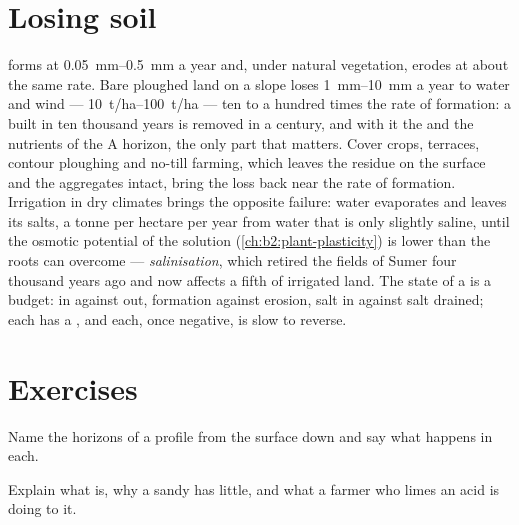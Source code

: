 \section{Losing soil}

\begin{proposition}\label{prop:b2:living-soil:erosion}
 forms at \qtyrange{0.05}{0.5}{mm} a year and, under natural
vegetation, erodes at about the same rate. Bare ploughed land on a
slope loses \qtyrange{1}{10}{mm} a year to water and wind ---
\qtyrange{10}{100}{t/ha} --- ten to a hundred times the rate of
formation: a  built in ten thousand years is removed in a
century, and with it the  and the nutrients of the A horizon,
the only part that matters. Cover crops, terraces, contour ploughing
and no-till farming, which leaves the residue on the surface and the
aggregates intact, bring the loss back near the rate of formation.
Irrigation in dry climates brings the opposite failure: water
evaporates and leaves its salts, a tonne per hectare per year from
water that is only slightly saline, until the osmotic potential of
the  solution (\cref{ch:b2:plant-plasticity}) is lower than the
roots can overcome --- \emph{salinisation}, which retired the
fields of Sumer four thousand years ago and now affects a fifth of
irrigated land. The state of a  is a budget:  in against
 out, formation against erosion, salt in against salt
drained; each has a , and each, once negative, is
slow to reverse.
\end{proposition}

\section{Exercises}

\begin{exercise}[$\star$]\label{exo:b2:living-soil:1}
Name the horizons of a  profile from the surface down and say
what happens in each.
\end{exercise}

\begin{exercise}[$\star$]\label{exo:b2:living-soil:2}
Explain what  is, why a sandy  has
little, and what a farmer who limes an acid  is doing to it.
\end{exercise}

